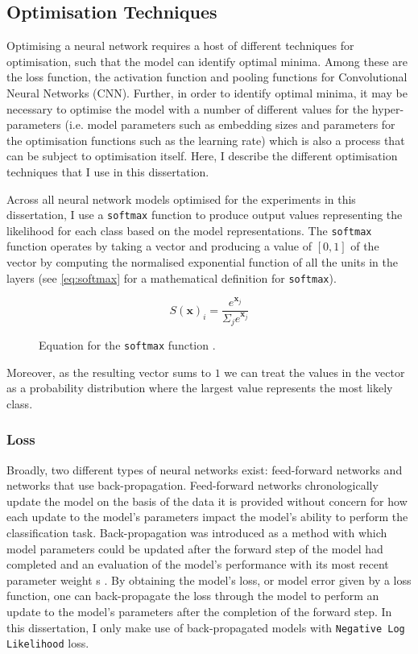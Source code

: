 \subsection{Optimisation Techniques}

Optimising a neural network requires a host of different techniques for optimisation, such that the model can identify optimal minima. Among these are the loss function, the activation function and pooling functions for Convolutional Neural Networks (CNN). Further, in order to identify optimal minima, it may be necessary to optimise the model with a number of different values for the hyper-parameters (i.e. model parameters such as embedding sizes and parameters for the optimisation functions such as the learning rate) which is also a process that can be subject to optimisation itself. Here, I describe the different optimisation techniques that I use in this dissertation.

Across all neural network models optimised for the experiments in this dissertation, I use a \texttt{softmax} function to produce output values representing the likelihood for each class based on the model representations. The \texttt{softmax} function operates by taking a vector and producing a value of $[0,1]$ of the vector by computing the normalised exponential function of all the units in the layers (see \cref{eq:softmax} for a mathematical definition for \texttt{softmax}).

\begin{figure}[h]
  \begin{equation}\label{eq:softmax}
    S(\mathbf{x})_i = \dfrac{e^{\mathbf{x}_j}}{\Sigma_j e^{\mathbf{x}_j}}
  \end{equation}
  \caption{Equation for the \texttt{softmax} function \citep{Goldberg:2017}.}
\end{figure}

Moreover, as the resulting vector sums to $1$ we can treat the values in the vector as a probability distribution where the largest value represents the most likely class.

\subsubsection{Loss}

Broadly, two different types of neural networks exist: feed-forward networks and networks that use back-propagation. 
Feed-forward networks chronologically update the model on the basis of the data it is provided without concern for how each update to the model's parameters impact the model's ability to perform the classification task. 
Back-propagation was introduced as a method with which model parameters could be updated after the forward step of the model had completed and an evaluation of the model's performance with its most recent parameter weight s\citep{Goldberg:2017} .
By obtaining the model's loss, or model error given by a loss function, one can back-propagate the loss through the model to perform an update to the model's parameters after the completion of the forward step.
In this dissertation, I only make use of back-propagated models with \texttt{Negative Log Likelihood} loss.

